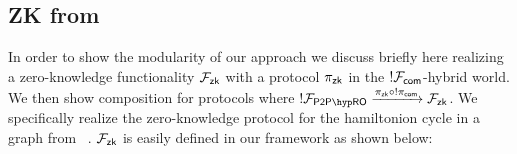 

\subsection{ZK from \Fcom}
In order to show the modularity of our approach we discuss briefly here realizing a zero-knowledge functionality $\mathcal{F}_{{\mathsf {zk}}}$ with a protocol $\pi_{{\mathsf {zk}}}$ in the $!\mathcal{F}_{{\mathsf {com}}}$-hybrid world.
We then show composition for protocols where $!\Fropp \xrightarrow{\pi_\msf{zk} \circ !\pi_\msf{com}} \F_\msf{zk}$.
We specifically realize the zero-knowledge protocol for the hamiltonion cycle in a graph from ~\cite{uccommitents}.
$\mathcal{F}_{{\mathsf {zk}}}$ is easily defined in our framework as shown below:

